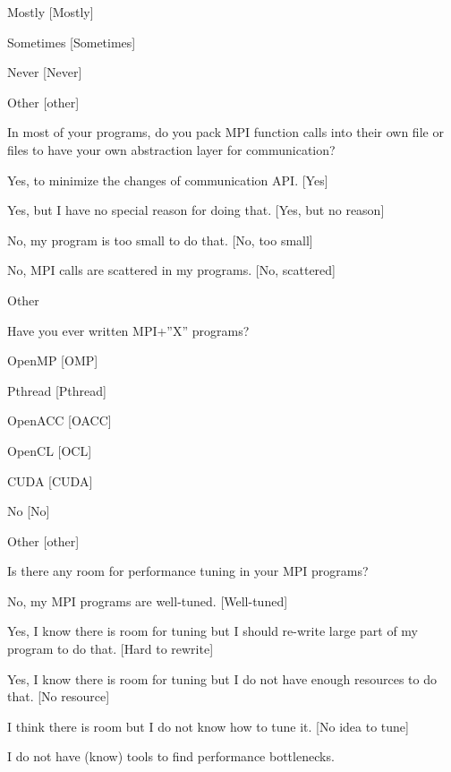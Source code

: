 \documentclass[preprint,5p,times]{elsarticle}
\begin{document}
{\begin{description}
\begin{inparaenum}[{\bf C}1)]
    \item Mostly [Mostly]
    \item Sometimes [Sometimes]
    \item Never [Never]
    \item Other [other]
    \end{inparaenum}
  \item[Q21:] In most of your programs, do you pack MPI function calls into their own file or files to have your own abstraction layer for communication?
    \begin{inparaenum}[{\bf C}1)]
    \item Yes, to minimize the changes of communication API. [Yes]
    \item Yes, but I have no special reason for doing that. [Yes, but no reason]
    \item No, my program is too small to do that. [No, too small]
    \item No, MPI calls are scattered in my programs. [No, scattered]
    \item Other
    \end{inparaenum}
  \item[Q22*:] Have you ever written MPI+”X” programs?
    \begin{inparaenum}[{\bf C}1)]
    \item OpenMP [OMP]
    \item Pthread [Pthread]
    \item OpenACC [OACC]
    \item OpenCL [OCL]
    \item CUDA [CUDA]
    \item No [No]
    \item Other [other]
    \end{inparaenum}
  \item[Q23:] Is there any room for performance tuning in your MPI programs?
    \begin{inparaenum}[{\bf C}1)]
    \item No, my MPI programs are well-tuned. [Well-tuned]
    \item Yes, I know there is room for tuning but I should re-write large
      part of my program to do that. [Hard to rewrite]
    \item Yes, I know there is room for tuning but I do not have enough resources to do that.
      [No resource]
    \item I think there is room but I do not know how to tune it.
      [No idea to tune]
    \item I do not have (know) tools to find performance bottlenecks.

\end{inparaenum}
\end{description}}
\end{document}
